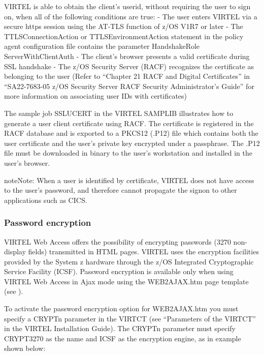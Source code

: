 \documentclass[letterpaper,10pt,english]{sphinxmanual}
\begin{document}
VIRTEL is able to obtain the client’s userid, without requiring the user to sign on, when all of the following conditions
are true:
- The user enters VIRTEL via a secure https session using the AT-TLS function of z/OS V1R7 or later
- The TTLSConnectionAction or TTLSEnvironmentAction statement in the policy agent configuration file contains the parameter HandshakeRole ServerWithClientAuth
- The client’s browser presents a valid certificate during SSL handshake
- The z/OS Security Server (RACF) recognizes the certificate as belonging to the user (Refer to “Chapter 21 RACF and Digital Certificates” in “SA22-7683-05 z/OS Security Server RACF Security Administrator’s Guide” for more information on associating user IDs with certificates)

The sample job SSLUCERT in the VIRTEL SAMPLIB illustrates how to generate a user client certificate using RACF. The
certificate is registered in the RACF database and is exported to a PKCS12 (.P12) file which contains both the user
certificate and the user’s private key encrypted under a passphrase. The .P12 file must be downloaded in binary to the
user’s workstation and installed in the user’s browser.

\begin{sphinxadmonition}{note}{Note:}
When a user is identified by certificate, VIRTEL does not have access to the user’s password, and therefore cannot propagate the signon to other applications such as CICS.
\end{sphinxadmonition}


\subsubsection{Password encryption}
\label{\detokenize{User_Guide:password-encryption}}\label{\detokenize{User_Guide:v457ug-password-encryption}}
VIRTEL Web Access offers the possibility of encrypting passwords (3270 non-display fields) transmitted in HTML pages.
VIRTEL uses the encryption facilities provided by the System z hardware through the z/OS Integrated Cryptographic
Service Facility (ICSF). Password encryption is available only when using VIRTEL Web Access in Ajax mode using the
WEB2AJAX.htm page template (see {\hyperref[\detokenize{User_Guide:v457ug-presentation-modes}]{}}).

To activate the password encryption option for WEB2AJAX.htm you must specify a CRYPTn parameter in the VIRTCT
(see “Parameters of the VIRTCT” in the VIRTEL Installation Guide). The CRYPTn parameter must specify CRYPT3270 as
the name and ICSF as the encryption engine, as in example shown below:
\end{document}
